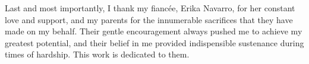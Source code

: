 Last and most importantly, I thank my fianc\'ee, Erika Navarro, for her constant love and support, and my parents for the innumerable sacrifices that they have made on my behalf.
Their gentle encouragement always pushed me to achieve my greatest potential, and their belief in me provided indispensible sustenance during times of hardship. 
This work is dedicated to them.

